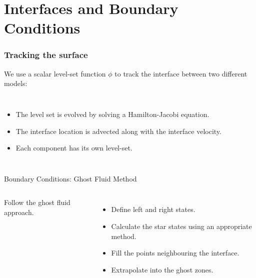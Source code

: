\documentclass{beamer}
\begin{document}
\section{Interfaces and Boundary Conditions}


\begin{frame}
\frametitle{Tracking the surface}
We use a scalar level-set function $\phi$ to track the interface between two different models:
\begin{columns}
\column{5cm}
\begin{itemize}
\item{The level set is evolved by solving a Hamilton-Jacobi equation.}
\item{The interface location is advected along with the interface velocity.}
\item{Each component has its own level-set.}
\end{itemize}
\column{5cm}
\end{columns}
\end{frame}


\begin{frame}{Boundary Conditions: Ghost Fluid Method}
\begin{columns}
\column{6.5cm}
\centering
\column{4.5cm}
Follow the ghost fluid approach.
\begin{itemize}
\item{Define left and right states.}
\item{Calculate the star states using an appropriate method.}
\item{Fill the points neighbouring the interface.}
\item{Extrapolate into the ghost zones.}
\end{itemize}
\end{columns}
\end{frame}
\end{document}
